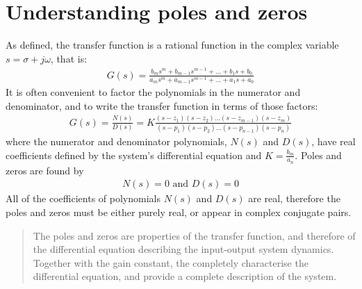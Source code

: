 \documentclass[class=report, crop=false, 12pt,a4paper]{standalone}
\begin{document}
\section{Understanding poles and zeros}
As defined, the transfer function is a rational function in the complex variable $s = \sigma + j \omega$, that is:
\begin{align}
  G(s) = \frac{b_m s^m + b_{m-1}s^{m-1} + ... + b_1 s + b_0}{a_m s^m + a_{m-1}s^{m-1} + ... + a_1 s + a_0}
\end{align}
It is often convenient to factor the polynomials in the numerator and denominator, and to write the transfer function in terms of those factors:
\begin{align}
  G(s) = \frac{N(s)}{D(s)} = K\frac{(s-z_1)(s-z_2)...(s-z_{m-1})(s-z_m)}{(s-p_1)(s-p_2)...(s-p_{n-1})(s-p_n)}
\end{align}
where the numerator and denominator polynomials, $N(s)$ and $D(s)$, have real coefficients defined by the system's differential equation and $K = \frac{b_m}{a_n}$. Poles and zeros are found by
\begin{align}
  N(s) = 0 \textrm{ and } D(s) = 0 
\end{align}
All of the coefficients of polynomials $N(s)$ and $D(s)$ are real, therefore the poles and zeros must be either purely real, or appear in complex conjugate pairs.
\begin{quote}
  The poles and zeros are properties of the transfer function, and therefore of the differential equation describing the input-output system dynamics. Together with the gain constant, the completely characterise the differential equation, and provide a complete description of the system.
\end{quote}
\end{document}
